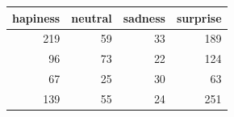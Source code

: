 \begin{tabular}{rrrr}
\toprule
hapiness & neutral & sadness & surprise \\
\midrule
219 & 59 & 33 & 189 \\
96 & 73 & 22 & 124 \\
67 & 25 & 30 & 63 \\
139 & 55 & 24 & 251 \\
\bottomrule
\end{tabular}
